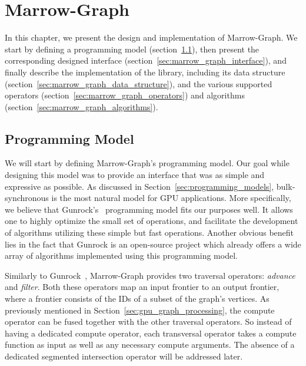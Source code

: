 %

\chapter{Marrow-Graph}


In this chapter, we present the design and implementation of Marrow-Graph. We start by defining a programming model (section~\ref{sec:marrow_graph_programming_model}), then present the corresponding designed interface (section~\ref{sec:marrow_graph_interface}), and finally describe the implementation of the library, including its data structure (section~\ref{sec:marrow_graph_data_structure}), and the various supported operators (section~\ref{sec:marrow_graph_operators}) and algorithms (section~\ref{sec:marrow_graph_algorithms}).


\section{Programming Model}
\label{sec:marrow_graph_programming_model}

We will start by defining Marrow-Graph's programming model. Our goal while designing this model was to provide an interface that was as simple and expressive as possible. As discussed in Section~\ref{sec:programming_models},  bulk-synchronous is the most natural model for \gls{GPU} applications. More specifically, we believe that Gunrock's~\cite{paper:gunrock} programming model fits our purposes well. It allows one to highly optimize the small set of operations, and facilitate the development of algorithms utilizing these simple but fast operations. Another obvious benefit lies in the fact that Gunrock is an open-source project which already offers a wide array of algorithms implemented using this programming model.

Similarly to Gunrock~\cite{paper:gunrock}, Marrow-Graph provides two traversal operators: \textit{advance} and \textit{filter}. Both these operators map an input frontier to an output frontier, where a frontier consists of the IDs of a subset of the graph's vertices. As previously mentioned in Section~\ref{sec:gpu_graph_processing}, the compute operator can be fused together with the other traversal operators. So instead of having a dedicated compute operator, each transversal operator takes a compute function as input as well as any necessary compute arguments. The absence of a dedicated segmented intersection operator will be addressed later.

